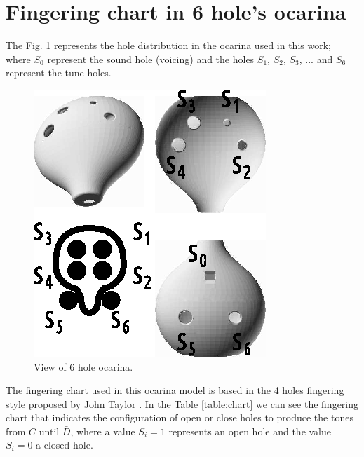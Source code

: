 \documentclass{article}
\begin{document}
\section{Fingering chart in  6 hole's ocarina}
The Fig. \ref{fig:ocarinaview} represents the hole distribution in the ocarina
used in this work; where $S_0$ represent the sound hole (voicing)
and the holes $S_1$, $S_2$, $S_3$, ... and $S_6$ represent the tune holes.
\begin{figure}[ht!]
\centering
\includegraphics[width=0.50\columnwidth]{ocarina-view.eps}
\caption{View of 6 hole ocarina. }
\label{fig:ocarinaview}
\end{figure}
The fingering chart used in this ocarina model is based in the 
4 holes fingering style proposed by John Taylor \cite[pp. 79, 146]{metropolitan1985american}. In the
Table \ref{table:chart} we can see the fingering chart that indicates the configuration of open or close holes
to produce the tones from $C$ until $\bar{D}$, where a value $S_i=1$ represents an
open hole and the value $S_i=0$ a closed hole.
\end{document}
